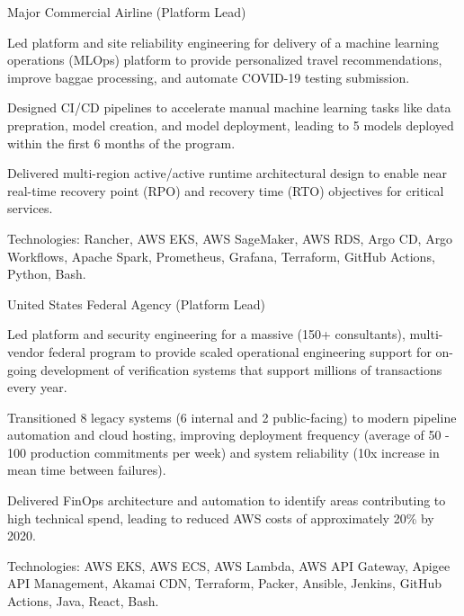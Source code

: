\begin{cventries}
  \cventry
    {Major Commercial Airline (Platform Lead)} %
    {} %
    {} %
    {} %
    {
      \begin{cvitems} %
        \item {Led platform and site reliability engineering for delivery of a machine learning operations (MLOps) platform to provide personalized travel recommendations, improve baggae processing, and automate COVID-19 testing submission.}
        \item {Designed CI/CD pipelines to accelerate manual machine learning tasks like data prepration, model creation, and model deployment, leading to 5 models deployed within the first 6 months of the program.}
        \item {Delivered multi-region active/active runtime architectural design to enable near real-time recovery point (RPO) and recovery time (RTO) objectives for critical services.}
        \item {Technologies: Rancher, AWS EKS, AWS SageMaker, AWS RDS, Argo CD, Argo Workflows, Apache Spark, Prometheus, Grafana, Terraform, GitHub Actions, Python, Bash.}
      \end{cvitems}
    }

  \cventry
    {United States Federal Agency (Platform Lead)} %
    {} %
    {} %
    {} %
    {
      \begin{cvitems} %
        \item {Led platform and security engineering for a massive (150+ consultants), multi-vendor federal program to provide scaled operational engineering support for on-going development of verification systems that support millions of transactions every year.}
        \item {Transitioned 8 legacy systems (6 internal and 2 public-facing) to modern pipeline automation and cloud hosting, improving deployment frequency (average of 50 - 100 production commitments per week) and system reliability (10x increase in mean time between failures).}
        \item {Delivered FinOps architecture and automation to identify areas contributing to high technical spend, leading to reduced AWS costs of approximately 20\% by 2020.}
        \item {Technologies: AWS EKS, AWS ECS, AWS Lambda, AWS API Gateway, Apigee API Management, Akamai CDN, Terraform, Packer, Ansible, Jenkins, GitHub Actions, Java, React, Bash.}
      \end{cvitems}
    }


\end{cventries}
